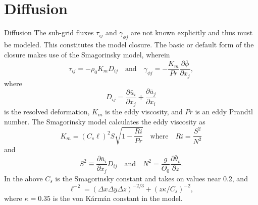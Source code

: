 \section[Diffusion]{Diffusion}
\begin{frame}[allowframebreaks]{Diffusion}
The sub-grid fluxes $\tau_{ij}$ and $\gamma_{\phi j}$ are not known
explicitly and thus must be modeled.  This constitutes the model
closure.  The basic or default form of the closure makes use of the
Smagorinsky model, wherein
\begin{equation*}
\tau_{ij} = - \rho_0 K_mD_{ij} \quad \text{and} \quad \gamma_{\phi j}
= - \frac{K_m}{Pr} \frac{\partial \bar{\phi}} {\partial x_j},
\end{equation*}
where \[D_{ij} = \frac{\partial \bar{u}_i}{\partial x_j} +
\frac{\partial \bar{u}_j}{\partial x_i}\] is the resolved deformation,
$K_m$ is the eddy viscosity, and $Pr$ is an eddy Prandtl number.  The
Smagorinsky model calculates the eddy viscosity as
\begin{equation*}
K_m = (C_s \ell)^2 S \sqrt{1 - \frac{Ri}{Pr}} \quad \text{where} \quad
Ri =
\frac{S^2}{N^2}
\end{equation*}
and
\begin{equation*}
S^2 \equiv \frac{\partial \bar{u}_i}{\partial x_j} D_{ij} \quad
\text{and} \quad N^2 = \frac{g}{\Theta_0} \frac{\partial
\bar{\theta}_v}{\partial z}.
\end{equation*}
In the above $C_s$ is the Smagorinsky constant and takes on values
near 0.2, and
\[ \ell^{-2} = (\Delta x \Delta y \Delta z)^{-2/3} + (z\kappa/C_s)^{-2},
\]  where $\kappa=0.35$ is the von K\'arm\'an constant in the model. 
\end{frame}

